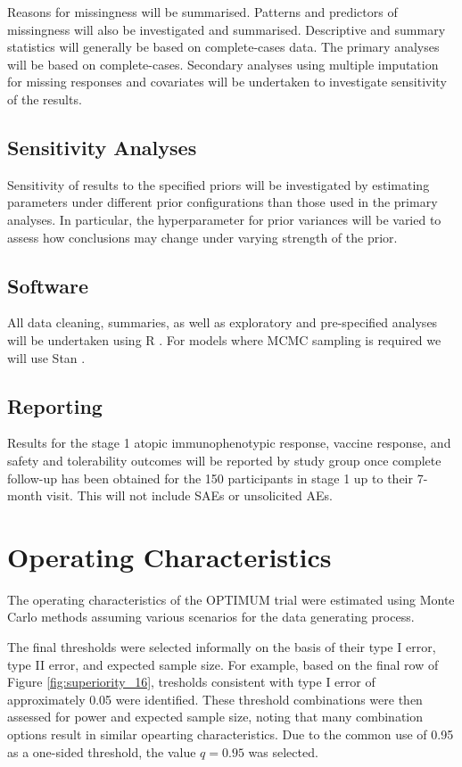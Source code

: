 \documentclass{bmcart}
\begin{document}
Reasons for missingness will be summarised.
Patterns and predictors of missingness will also be investigated and summarised.
Descriptive and summary statistics will generally be based on complete-cases data.
The primary analyses will be based on complete-cases.
Secondary analyses using multiple imputation for missing responses and covariates will be undertaken to investigate sensitivity of the results.

\subsection*{Sensitivity Analyses}

Sensitivity of results to the specified priors will be investigated by estimating parameters under different prior configurations than those used in the primary analyses.
In particular, the hyperparameter for prior variances will be varied to assess how conclusions may change under varying strength of the prior.

\subsection*{Software}

All data cleaning, summaries, as well as exploratory and pre-specified analyses will be undertaken using R \cite{rlang}.
For models where MCMC sampling is required we will use Stan \cite{stanlang}.

\subsection*{Reporting}

Results for the stage 1 atopic immunophenotypic response, vaccine response, and safety and tolerability outcomes will be reported by study group once complete follow-up has been obtained for the 150 participants in stage 1 up to their 7-month visit. This will not include SAEs or unsolicited AEs.

\section*{Operating Characteristics}

The operating characteristics of the OPTIMUM trial were estimated using Monte Carlo methods assuming 
various scenarios for the data generating process.

The final thresholds were selected informally on the basis of their type I error, type II error, and expected sample size.
For example, based on the final row of Figure \ref{fig:superiority_16}, tresholds consistent with type I error of approximately 0.05 were identified.
These threshold combinations were then assessed for power and expected sample size, noting that many combination options result in similar opearting characteristics.
Due to the common use of 0.95 as a one-sided threshold, the value $q=0.95$ was selected.
\end{document}
